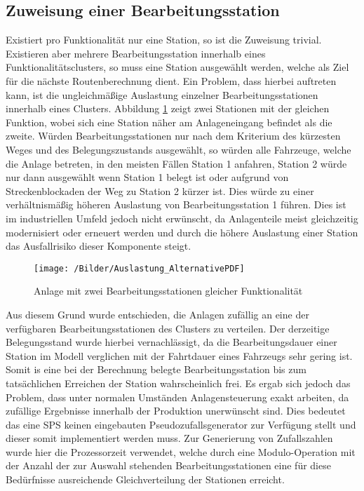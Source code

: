 		\subsection{Zuweisung einer Bearbeitungsstation}
			\label{Zuweisung_Station}
			Existiert pro Funktionalität nur eine Station, so ist die Zuweisung trivial. Existieren aber mehrere Bearbeitungsstation innerhalb eines Funktionalitätsclusters, so muss eine Station ausgewählt werden, welche als Ziel für die nächste Routenberechnung dient. Ein Problem, dass hierbei auftreten kann, ist die ungleichmäßige Auslastung einzelner Bearbeitungsstationen innerhalb eines Clusters. Abbildung \ref{Alternativen} zeigt zwei Stationen mit der gleichen Funktion, wobei sich eine Station näher am Anlageneingang befindet als die zweite. Würden Bearbeitungsstationen nur nach dem Kriterium des kürzesten Weges und des Belegungszustands ausgewählt, so würden alle Fahrzeuge, welche die Anlage betreten, in den meisten Fällen Station 1 anfahren, Station 2 würde nur dann ausgewählt wenn Station 1 belegt ist oder aufgrund von Streckenblockaden der Weg zu Station 2 kürzer ist. Dies würde zu einer verhältnismäßig höheren Auslastung von Bearbeitungsstation 1 führen. Dies ist im industriellen Umfeld jedoch nicht erwünscht, da Anlagenteile meist gleichzeitig modernisiert oder erneuert werden und durch die höhere Auslastung einer Station das Ausfallrisiko dieser Komponente steigt.
			
			\begin{figure}[h]
				\centering
				\texttt{[image: /Bilder/Auslastung\_AlternativePDF]}
				
				\vspace{0.2cm}
				\caption{Anlage mit zwei Bearbeitungsstationen gleicher Funktionalität}\label{Alternativen}
			\end{figure}
			
		
			Aus diesem Grund wurde entschieden, die Anlagen zufällig an eine der verfügbaren Bearbeitungsstationen des Clusters zu verteilen. Der derzeitige Belegungsstand wurde hierbei vernachlässigt, da die Bearbeitungsdauer einer Station im Modell verglichen mit der Fahrtdauer eines Fahrzeugs sehr gering ist. Somit is eine bei der Berechnung belegte Bearbeitungsstation bis zum tatsächlichen Erreichen der Station wahrscheinlich frei.  Es ergab sich jedoch das Problem, dass unter normalen Umständen Anlagensteuerung exakt arbeiten, da zufällige Ergebnisse innerhalb der Produktion unerwünscht sind. Dies bedeutet das eine \ac{SPS} keinen eingebauten Pseudozufallsgenerator zur Verfügung stellt und dieser somit implementiert werden muss. Zur Generierung von Zufallszahlen wurde hier die Prozessorzeit verwendet, welche durch eine Modulo-Operation mit der Anzahl der zur Auswahl stehenden Bearbeitungsstationen eine für diese Bedürfnisse ausreichende Gleichverteilung der Stationen erreicht.
		
